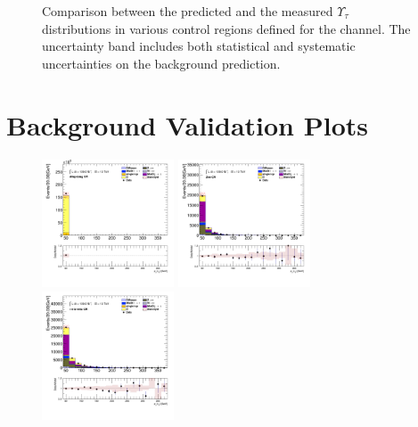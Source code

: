 \begin{figure}[!htp]
\begin{center}
			\end{center}
			\caption{
			Comparison between the predicted and the measured $\Upsilon_{\tau}$ distributions in various control regions defined for the \taujets channel. The uncertainty band includes both statistical and systematic uncertainties on the background prediction. 
			}
			\label{fig:bkg-met-phi-taujets}
		\end{figure}

		\clearpage
	\section{\taulep Background Validation Plots}\label{sec:taulep-valid-plots}

		\begin{figure}[!htp]
			\begin{center}    
			\includegraphics[width=0.35\textwidth]{chapters/chapter6_HPlus/images/taulep/tau_0_pt_DILEP_BTAG.png}
			\includegraphics[width=0.35\textwidth]{chapters/chapter6_HPlus/images/taulep/tau_0_pt_ZEE.png} \\
			\includegraphics[width=0.35\textwidth]{chapters/chapter6_HPlus/images/taulep/tau_0_pt_TAUEL_BVETO.png} 

\end{center}
\end{figure}
